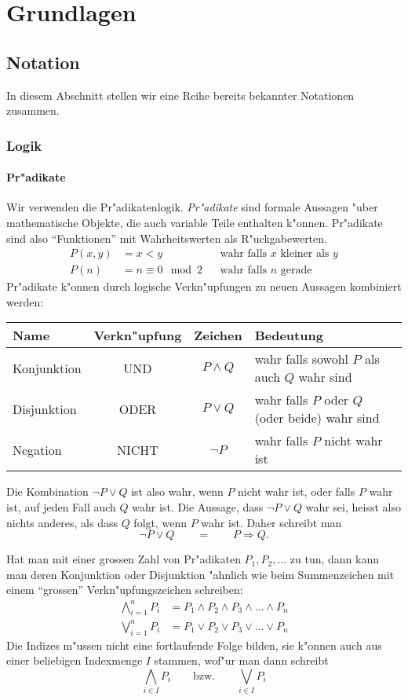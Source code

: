 %
%
%
\chapter{Grundlagen}
\section{Notation}
In diesem Abschnitt stellen wir eine Reihe bereits bekannter Notationen
zusammen.
\subsection{Logik}
\subsubsection{Pr"adikate}
Wir verwenden die Pr"adikatenlogik.
{\em Pr"adikate} sind formale Aussagen "uber mathematische Objekte, die auch
variable Teile enthalten k"onnen. Pr"adikate sind also ``Funktionen'' mit
Wahrheitswerten als R"uckgabewerten.
\begin{align*}
P(x,y)&=x < y&&\text{wahr falls $x$ kleiner als $y$}\\
P(n)&=n \equiv 0\mod 2&&\text{wahr falls $n$ gerade}
\end{align*}
Pr"adikate k"onnen durch logische Verkn"upfungen zu neuen Aussagen kombiniert
werden:
\begin{center}
\begin{tabular}{|l|c|c|l|}
\hline
Name&Verkn"upfung&Zeichen&Bedeutung\\
\hline
\index{Konjunktion}
Konjunktion&UND&$P\wedge Q$&wahr falls sowohl $P$ als auch $Q$ wahr sind\\
\index{Disjunktion}
Disjunktion&ODER&$P\vee Q$&wahr falls $P$ oder $Q$ (oder beide) wahr sind\\
\index{Negation}
Negation&NICHT&$\neg P$&wahr falls $P$ nicht wahr ist\\
\hline
\end{tabular}
\end{center}
Die Kombination $\neg P\vee Q$ ist also wahr, wenn $P$ nicht
wahr ist, oder falls $P$ wahr ist, auf jeden Fall auch $Q$
wahr ist. Die Aussage, dass $\neg P\vee Q$ wahr sei, heisst also
nichts anderes, als dass $Q$ folgt, wenn $P$ wahr ist. Daher schreibt
man
\[
\neg P\vee Q\qquad =\qquad P\Rightarrow Q.
\]

Hat man mit einer grossen Zahl von Pr"adikaten $P_1,P_2,\dots$ zu tun,
dann kann man deren Konjunktion oder Disjunktion "ahnlich wie beim Summenzeichen
mit einem ``grossen'' Verkn"upfungszeichen schreiben:
\begin{align*}
\bigwedge_{i=1}^n P_i&=P_1\wedge P_2\wedge P_3\wedge\dots\wedge P_n\\
\bigvee_{i=1}^n P_i&=P_1\vee P_2\vee P_3\vee\dots\vee P_n
\end{align*}
Die Indizes m"ussen nicht eine fortlaufende Folge bilden, sie k"onnen
auch aus einer beliebigen Indexmenge $I$ stammen, wof"ur man dann
schreibt
\[
\bigwedge_{i\in I}P_i
\qquad
\text{bzw.}
\qquad
\bigvee_{i\in I}P_i
\]

